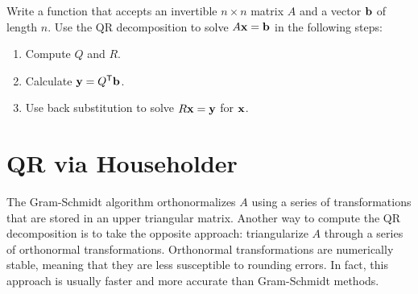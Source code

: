 \begin{problem} %
Write a function that accepts an invertible $n \times n$ matrix $A$ and a vector $\mathbf{b}$ of length $n$.
Use the QR decomposition to solve $A\mathbf{x} = \mathbf{b}$ in the following steps:
\begin{enumerate}
    \item Compute $Q$ and $R$.
    \item Calculate $\mathbf{y} = Q^{\mathsf T}\mathbf{b}$.
    \item Use back substitution to solve $R\mathbf{x} = \mathbf{y}$ for $\mathbf{x}$.
\end{enumerate}
\end{problem}

\section*{QR via Householder} %

The Gram-Schmidt algorithm orthonormalizes $A$ using a series of transformations that are stored in an upper triangular matrix.
Another way to compute the QR decomposition is to take the opposite approach: triangularize $A$ through a series of orthonormal transformations.
Orthonormal transformations are numerically stable, meaning that they are less susceptible to rounding errors.
In fact, this approach is usually faster and more accurate than Gram-Schmidt methods.

